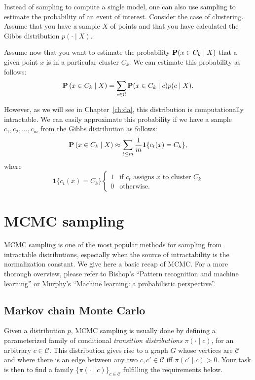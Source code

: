 Instead of sampling to compute a single model, one can also use sampling to estimate the probability of an event of interest. Consider the case of clustering. Assume that you have a sample $X$ of points and that you have calculated the Gibbs distribution $p(\cdot \mid X)$. 

Assume now that you want to estimate the probability $\mathbf{P}(x \in C_k \mid X)$ that a given point $x$ is in a particular cluster $C_k$. We can estimate this probability as follows:
%
\begin{equation}
\mathbf{P}\left(x \in C_k \mid X\right) = \sum_{c \in \mathcal{C}} \mathbf{P}(x \in C_k \mid c) p(c \mid X).
\end{equation}

However, as we will see in Chapter~\ref{ch:da}, this distribution is computationally intractable. We can easily approximate this probability if we have a sample $c_1, c_2, \ldots, c_m$ from the Gibbs distribution as follows:
%
\begin{equation}
\mathbf{P}\left(x \in C_k \mid X\right) \approx \sum_{t \leq m} \frac{1}{m}\mathbf{1}\{c_t(x) = C_k\},
\end{equation}
%
where
%
\begin{equation}
\mathbf{1}\{c_t(x) = C_k\}
\begin{cases}
1 & \text{if $c_t$ assigns $x$ to cluster $C_k$}\\
0 & \text{otherwise.}
\end{cases}
\end{equation}
%

\section{MCMC sampling}
\label{sec:mcmc}

MCMC sampling is one of the most popular methods for sampling from
intractable distributions, especially when the source of intractability is the
normalization constant. We give here a basic recap of MCMC. For a more
thorough overview, please refer to Bishop's ``Pattern recognition and machine
learning'' or Murphy's ``Machine learning: a probabilistic perspective''.

\subsection{Markov chain Monte Carlo}

Given a distribution $p$, MCMC sampling is usually done by defining a
parameterized family of conditional \emph{transition distributions} $\pi(\cdot \mid c)$, for an
arbitrary $c \in \mathcal{C}$. This distribution gives rise to a graph $G$ whose vertices
are $\mathcal{C}$ and where there is an edge between any two $c, c' \in \mathcal{C}$ iff $\pi(c' \mid c) > 0$. Your task is then to find a family $\{\pi(\cdot \mid c)\}_{c \in \mathcal{C}}$ fulfilling the requirements below.


